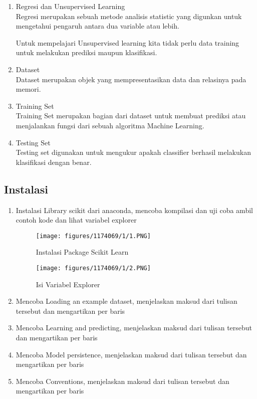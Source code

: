 \begin{enumerate}
\item Regresi dan Unsupervised Learning\\
Regresi merupakan sebuah metode analisis statistic yang digunkan untuk mengetahui pengaruh antara dua variable atau lebih.

Untuk mempelajari Unsupervised learning kita tidak perlu data training untuk melakukan prediksi maupun klasifikasi.

\item Dataset\\
Dataset merupakan objek yang mempresentasikan data dan relasinya pada memori.

\item Training Set\\
Training Set merupakan bagian dari dataset untuk membuat prediksi atau menjalankan fungsi dari sebuah algoritma Machine Learning.

\item Testing Set\\
Testing set digunakan untuk mengukur apakah classifier berhasil melakukan klasifikasi dengan benar.

\end{enumerate}

\subsection{Instalasi}
\begin{enumerate}
	\item Instalasi Library scikit dari anaconda, mencoba kompilasi dan uji coba ambil contoh kode dan lihat variabel explorer
	\hfill\break
	\begin{figure}[H]
		\texttt{[image: figures/1174069/1/1.PNG]}
		\centering
		\caption{Instalasi Package Scikit Learn}
	\end{figure}
	\begin{figure}[H]
		\texttt{[image: figures/1174069/1/2.PNG]}
		\centering
		\caption{Isi Variabel Explorer}
	\end{figure}
	\item Mencoba Loading an example dataset, menjelaskan maksud dari tulisan tersebut dan mengartikan           		  per baris
	\hfill\break
	
	\item Mencoba Learning and predicting, menjelaskan maksud dari tulisan tersebut dan mengartikan per  			  baris
	\hfill\break
	
	\item  Mencoba Model persistence, menjelaskan maksud dari tulisan tersebut dan mengartikan per baris
	\hfill\break
	
	\item Mencoba Conventions, menjelaskan maksud dari tulisan tersebut dan mengartikan per baris
	\hfill\break
	
\end{enumerate}

